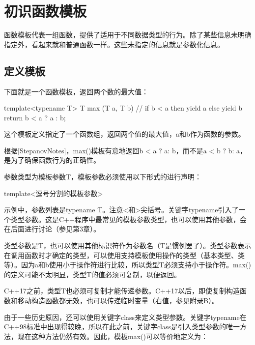 \section{初识函数模板}

函数模板代表一组函数，提供了适用于不同数据类型的行为。除了某些信息未明确指定外，看起来就和普通函数一样。这些未指定的信息就是参数化信息。

\subsection{定义模板}

下面就是一个函数模板，返回两个数的最大值：

\begin{cpp}
template<typename T>
T max (T a, T b) {
	// if b < a then yield a else yield b
	return b < a ? a : b;
}
\end{cpp}

这个模板定义指定了一个函数组，返回两个值的最大值，a和b作为函数的参数。

\begin{notice}
根据[StepanovNotes]，max()模板有意地返回b < a ? a: b，而不是a < b ? b: a，是为了确保函数行为的正确性。
\end{notice}

参数类型为模板参数T，模板参数必须使用以下形式的进行声明：

\begin{cpp}
template<逗号分割的模板参数>
\end{cpp}

示例中，参数列表是typename T。注意<和>尖括号。关键字typename引入了一个类型参数。这是C++程序中最常见的模板参数类型，也可以使用其他参数，会在后面进行讨论（参见第3章）。

类型参数是T，也可以使用其他标识符作为参数名（T是惯例罢了）。类型参数表示在调用函数时才确定的类型，可以使用支持模板使用操作的类型（基本类型、类等）。因为a和b使用小于操作符进行比较，所以类型T必须支持小于操作符。max()的定义可能不太明显，类型T的值必须可复制，以便返回。

\begin{notice}
C++17之前，类型T也必须可复制才能传递参数。C++17以后，即使复制构造函数和移动构造函数都无效，也可以传递临时变量（右值，参见附录B）。
\end{notice}

由于一些历史原因，还可以使用关键字class来定义类型参数。关键字typename在C++98标准中出现得较晚，所以在此之前，关键字class是引入类型参数的唯一方法，现在这种方法仍然有效。因此，模板max()可以等价地定义为：

